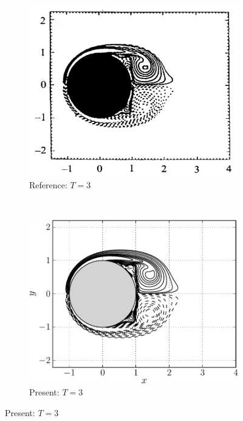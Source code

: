 \begin{figure}[p]
     \begin{subfigure}[t]{0.45\textwidth}
             \includegraphics[height=0.2\textheight]{figures/eulerian/ISC_vorticityContours_t3_ref-mod.png}
             \caption{Reference: $T=3$}
             \label{fig:ISC_vorticityContours_t3_ref}
     \end{subfigure}%
     ~ %
     \begin{subfigure}[t]{0.45\textwidth}
             \includegraphics[height=0.2\textheight]{figures/eulerian/ISC_vorticityContours_t3_fliped-crop.pdf}
             \caption{Present: $T=3$}
             \label{fig:ISC_vorticityContours_t3-crop}
     \end{subfigure} 
     

\end{figure}
